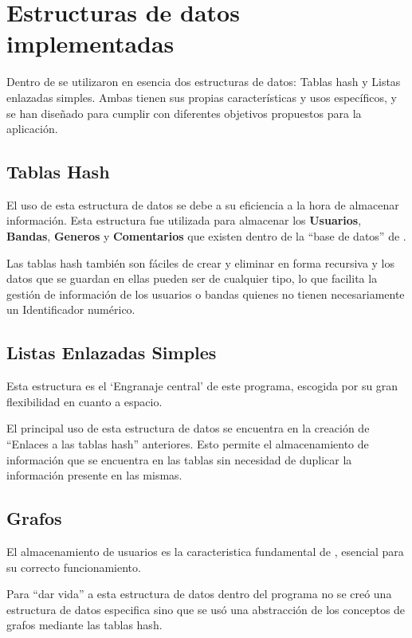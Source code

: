 \section{Estructuras de datos implementadas}
Dentro de \loopweb se utilizaron en esencia dos estructuras de datos: Tablas hash y Listas enlazadas simples. Ambas tienen sus propias características y usos específicos, y se han diseñado para cumplir con diferentes objetivos propuestos para la aplicación.

\subsection{Tablas Hash}
El uso de esta estructura de datos se debe a su eficiencia a la hora de almacenar información. Esta estructura fue utilizada para almacenar los \textbf{Usuarios}, \textbf{Bandas}, \textbf{Generos} y \textbf{Comentarios} que existen dentro de la ``base de datos'' de \loopweb.

Las tablas hash también son fáciles de crear y eliminar en forma recursiva y los datos que se guardan en ellas pueden ser de cualquier tipo, lo que facilita la gestión de información de los usuarios o bandas quienes no tienen necesariamente un Identificador numérico.

\subsection{Listas Enlazadas Simples}
Esta estructura es el `Engranaje central' de este programa, escogida por su gran flexibilidad en cuanto a espacio.

El principal uso de esta estructura de datos se encuentra en la creación de ``Enlaces a las tablas hash'' anteriores. Esto permite el almacenamiento de información que se encuentra en las tablas sin necesidad de duplicar la información presente en las mismas.

\subsection{Grafos}
El almacenamiento de usuarios es la caracteristica fundamental de \loopweb, esencial para su correcto funcionamiento.

Para ``dar vida'' a esta estructura de datos dentro del programa no se creó una estructura de datos especifica sino que se usó una abstracción de los conceptos de grafos mediante las tablas hash.

